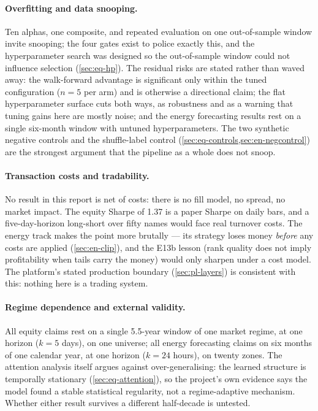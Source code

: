 \paragraph{Overfitting and data snooping.} Ten alphas, one composite,
and repeated evaluation on one out-of-sample window invite snooping; the
four gates exist to police exactly this, and the hyperparameter search
was designed so the out-of-sample window could not influence selection
(\cref{sec:eq-hp}). The residual risks are stated rather than waved
away: the walk-forward advantage is significant only within the tuned
configuration ($n=5$ per arm) and is otherwise a directional claim; the
flat hyperparameter surface cuts both ways, as robustness and as a
warning that tuning gains here are mostly noise; and the energy
forecasting results rest on a single six-month window with untuned
hyperparameters. The two synthetic negative controls and the
shuffle-label control (\cref{sec:eq-controls,sec:en-negcontrol}) are the
strongest argument that the pipeline as a whole does not snoop.

\paragraph{Transaction costs and tradability.} No result in this report
is net of costs: there is no fill model, no spread, no market impact.
The equity Sharpe of 1.37 is a paper Sharpe on daily bars, and a
five-day-horizon long-short over fifty names would face real turnover
costs. The energy track makes the point more brutally --- its strategy
loses money \emph{before} any costs are applied
(\cref{sec:en-clip}), and the E13b lesson (rank quality does not imply
profitability when tails carry the money) would only sharpen under a
cost model. The platform's stated production boundary
(\cref{sec:pl-layers}) is consistent with this: nothing here is a
trading system.

\paragraph{Regime dependence and external validity.} All equity claims
rest on a single 5.5-year window of one market regime, at one horizon
($k=5$ days), on one universe; all energy forecasting claims on six
months of one calendar year, at one horizon ($k=24$ hours), on twenty
zones. The attention analysis itself argues against over-generalising:
the learned structure is temporally stationary
(\cref{sec:eq-attention}), so the project's own evidence says the model
found a stable statistical regularity, not a regime-adaptive mechanism.
Whether either result survives a different half-decade is untested.

